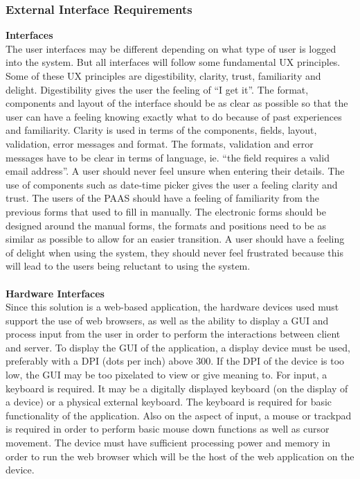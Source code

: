 \documentclass{article}
\begin{document}
\subsubsection{External Interface Requirements} 
\textbf{Interfaces} \\
The user interfaces may be different depending on what type of user is logged into the system. But all interfaces will follow some fundamental UX principles.
Some of these UX principles are digestibility, clarity, trust, familiarity and delight. Digestibility gives the user the feeling of “I get it”. The format, components and layout of the interface should be as clear as possible so that the user can have a feeling knowing exactly what to do because of past experiences and familiarity. Clarity is used in terms of the components, fields, layout, validation, error messages and format. The formats, validation and error messages have to be clear in terms of language, ie. “the field requires a valid email address”. A user should never feel unsure when entering their details. The use of components such as date-time picker gives the user a feeling clarity and trust. The users of the PAAS should have a feeling of familiarity from the previous forms that used to fill in manually. The electronic forms should be designed around the manual forms, the formats and positions need to be as similar as possible to allow for an easier transition. A user should have a feeling of delight when using the system, they should never feel frustrated because this will lead to the users being reluctant to using the system. \cite{product-design} \\ \\
\textbf{Hardware Interfaces} \\
Since this solution is a web-based application, the hardware devices used must support the use of web browsers, as well as the ability to display a GUI and process input from the user in order to perform the interactions between client and server. To display the GUI of the application, a display device must be used, preferably with a DPI (dots per inch) above 300. If the DPI of the device is too low, the GUI may be too pixelated to view or give meaning to. For input, a keyboard is required. It may be a digitally displayed keyboard (on the display of a device) or a physical external keyboard. The keyboard is required for basic functionality of the application. Also on the aspect of input, a mouse or trackpad is required in order to perform basic mouse down functions as well as cursor movement. The device must have sufficient processing power and memory in order to run the web browser which will be the host of the web application on the device.  \\ \\
\end{document}
